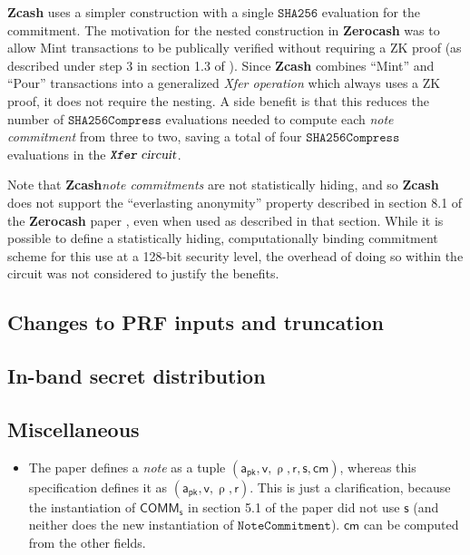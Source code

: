\documentclass{article}
\newcommand{\todo}[1]{{\color{Sepia}\sf{TODO: #1}}}
\newcommand{\term}[1]{\textsl{#1}\xspace}
\newcommand{\termbf}[1]{\textbf{#1}\xspace}
\newcommand{\Zcash}{\termbf{Zcash}}
\newcommand{\Zerocash}{\termbf{Zerocash}}
\newcommand{\coin}{\term{note}}
\newcommand{\coinCommitment}{\term{note commitment}}
\newcommand{\coinCommitments}{\term{note commitments}}
\newcommand{\pourTransfer}{\term{Xfer operation}}
\newcommand{\CRH}{\mathsf{CRH}}
\newcommand{\FullHash}{\mathtt{SHA256}}
\newcommand{\AuthPublic}{\mathsf{a_{pk}}}
\newcommand{\Value}{\mathsf{v}}
\newcommand{\CoinCommitRand}{\mathsf{r}}
\newcommand{\CoinAddressRand}{\mathsf{\uprho}}
\newcommand{\CoinCommitS}{\mathsf{s}}
\newcommand{\SHA}{\mathtt{SHA256Compress}}
\newcommand{\cm}{\mathsf{cm}}
\newcommand{\PourCircuit}{\term{\texttt{Xfer} circuit}}
\newcommand{\COMM}[1]{\mathsf{COMM}_{#1}}
\newcommand{\Commitment}{\mathtt{NoteCommitment}}
\begin{document}
\Zcash uses a simpler construction with a single $\FullHash$ evaluation
for the commitment. The motivation for the nested construction in \Zerocash
was to allow Mint transactions to be publically verified without requiring
a ZK proof (as described under step 3 in section 1.3 of
\cite{ZerocashOakland}). Since \Zcash combines ``Mint'' and ``Pour''
transactions into a generalized \pourTransfer which always uses a ZK proof,
it does not require the nesting. A side benefit is that this reduces the
number of $\SHA$ evaluations needed to compute each \coinCommitment from
three to two, saving a total of four $\SHA$ evaluations in the
$\PourCircuit$.

Note that \Zcash \coinCommitments are not statistically hiding, and
so \Zcash does not support the ``everlasting anonymity'' property
described in section 8.1 of the \Zerocash paper \cite{ZerocashOakland},
even when used as described in that section. While it is possible to
define a statistically hiding, computationally binding commitment scheme
for this use at a 128-bit security level, the overhead of doing so
within the circuit was not considered to justify the benefits.

\subsection{Changes to PRF inputs and truncation}

\todo{}


\subsection{In-band secret distribution}

\todo{}

\subsection{Miscellaneous}

\begin{itemize}
    \item The paper defines a \coin as a tuple $(\AuthPublic, \Value,
\CoinAddressRand, \CoinCommitRand, \CoinCommitS, \cm)$, whereas this specification
defines it as $(\AuthPublic, \Value, \CoinAddressRand, \CoinCommitRand)$.
This is just a clarification, because the instantiation of $\COMM{\CoinCommitS}$
in section 5.1 of the paper did not use $\CoinCommitS$ (and neither does the
new instantiation of $\Commitment$). $\cm$ can be computed from the other
fields.
\end{itemize}
\end{document}
